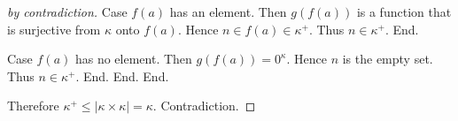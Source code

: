 \documentclass[english]{article}
\begin{document}
\begin{forthel}
\begin{proof}[by contradiction]
          Case $f(a)$ has an element.
            Then $g(f(a))$ is a function that is surjective from $\kappa$ onto
            $f(a)$.
            Hence $n \in f(a) \in \kappa^{+}$.
            Thus $n \in \kappa^{+}$.
          End.

          Case $f(a)$ has no element.
            Then $g(f(a)) = 0^{\kappa}$.
            Hence $n$ is the empty set.
            Thus $n \in \kappa^{+}$.
          End.
        End.
      End.

      Therefore $\kappa^{+} \leq |\kappa \times \kappa| = \kappa$.
      Contradiction.
    \end{proof}
  \end{forthel}

  \printbibliography
\end{document}
